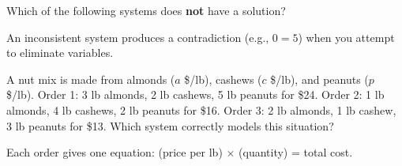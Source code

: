 \documentclass{ximera}
\begin{document}
\begin{problem}
Which of the following systems does \textbf{not} have a solution?
\begin{hint}
An inconsistent system produces a contradiction (e.g., $0 = 5$) when you attempt to eliminate variables.
\end{hint}
\begin{multipleChoice}
\end{multipleChoice}
\end{problem}

\begin{problem}
A nut mix is made from almonds ($a$ \$/lb), cashews ($c$ \$/lb), and peanuts ($p$ \$/lb). Order 1: 3 lb almonds, 2 lb cashews, 5 lb peanuts for \$24. Order 2: 1 lb almonds, 4 lb cashews, 2 lb peanuts for \$16. Order 3: 2 lb almonds, 1 lb cashew, 3 lb peanuts for \$13. Which system correctly models this situation?
\begin{hint}
Each order gives one equation: (price per lb) $\times$ (quantity) = total cost.
\end{hint}
\begin{multipleChoice}
\end{multipleChoice}
\end{problem}
\end{document}
